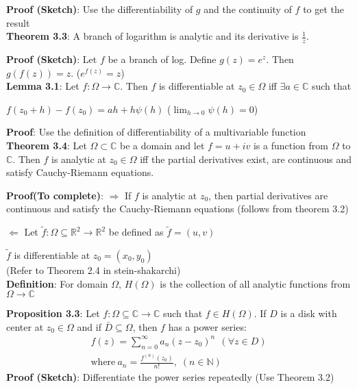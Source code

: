 \documentclass{article}
\begin{document}
\begin{flushleft}
\textbf{Proof (Sketch)}: Use the differentiability of $g$ and the continuity of $f$ to get the result \\
\vspace{3mm}
\textbf{Theorem 3.3}: A branch of logarithm is analytic and its derivative is $\frac{1}{z}$.

\textbf{Proof (Sketch)}: Let $f$ be a branch of log. Define $g(z)=e^z$. Then $g(f(z))=z$. ($e^{f(z)}=z$)\\
\vspace{3mm}
\textbf{Lemma 3.1}: Let $f:\Omega \rightarrow \mathds{C}$. Then $f$ is differentiable at $z_0\in \Omega$ iff $\exists a\in \mathds{C}$ such that 

$f(z_0+h)-f(z_0)= ah+h\psi(h)$ ($\lim_{h \to 0} \psi(h)=0$)

\textbf{Proof}: Use the definition of differentiability of a multivariable function\\
\vspace{3mm}
\textbf{Theorem 3.4}: Let $\Omega \subset \mathds{C}$ be a domain and let $f=u+iv$ is a function from $\Omega$ to $\mathds{C}$.
Then $f$ is analytic at $z_0\in \Omega$ iff the partial derivatives exist, are continuous and satisfy Cauchy-Riemann equations.

\textbf{Proof(To complete)}: $\Rightarrow$ If $f$ is analytic at $z_0$, then partial derivatives are continuous and satisfy the Cauchy-Riemann equations (follows from theorem 3.2)

$\Leftarrow$ Let $\tilde{f}:\Omega \subseteq \mathds{R}^2\rightarrow \mathds{R}^2$ be defined as $\tilde{f}=(u,v)$

$\tilde{f}$ is differentiable at $z_0=(x_0,y_0)$\\
(Refer to Theorem 2.4 in stein-shakarchi)\\
\vspace{2mm}
\textbf{Definition}: For domain $\Omega$, $H(\Omega)$ is the collection of all analytic functions from $\Omega \rightarrow \mathds{C}$

\textbf{Proposition 3.3}: Let $f:\Omega\subseteq \mathds{C} \rightarrow \mathds{C}$ such that $f\in H(\Omega)$. If $D$ is a disk with center at $z_0\in \Omega$ and if $\bar{D}\subseteq \Omega$, then $f$ has a power series:
\begin{align}
f(z)=\sum_{n=0}^{\infty} a_n(z-z_0)^n \:\:(\forall z\in D) \nonumber\\
\text{where}\: a_n=\frac{f^{(n)}(z_0)}{n!}\text{,}\:\: (n\in \mathds{N})\nonumber
\end{align}
\textbf{Proof (Sketch)}: Differentiate the power series repeatedly (Use Theorem 3.2)


\end{flushleft}
\end{document}
